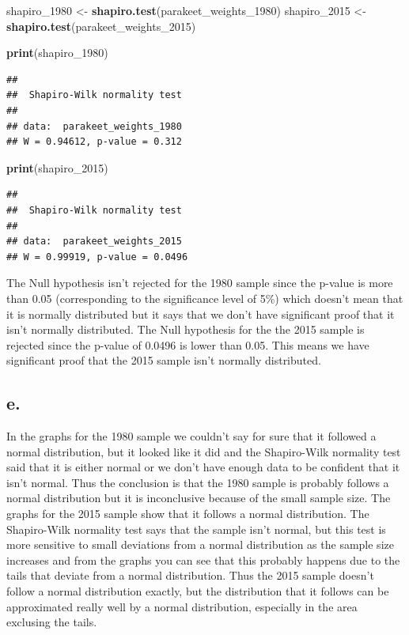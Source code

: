 \documentclass[
]{article}
\newenvironment{Shaded}{\begin{snugshade}}{\end{snugshade}}
\newcommand{\FunctionTok}[1]{\textcolor[rgb]{0.13,0.29,0.53}{\textbf{#1}}}
\newcommand{\NormalTok}[1]{#1}
\newcommand{\OtherTok}[1]{\textcolor[rgb]{0.56,0.35,0.01}{#1}}
\begin{document}
\begin{Shaded}
\begin{Highlighting}[]
\NormalTok{shapiro\_1980 }\OtherTok{\textless{}{-}} \FunctionTok{shapiro.test}\NormalTok{(parakeet\_weights\_1980)}
\NormalTok{shapiro\_2015 }\OtherTok{\textless{}{-}} \FunctionTok{shapiro.test}\NormalTok{(parakeet\_weights\_2015)}

\FunctionTok{print}\NormalTok{(shapiro\_1980)}
\end{Highlighting}
\end{Shaded}

\begin{verbatim}
## 
##  Shapiro-Wilk normality test
## 
## data:  parakeet_weights_1980
## W = 0.94612, p-value = 0.312
\end{verbatim}

\begin{Shaded}
\begin{Highlighting}[]
\FunctionTok{print}\NormalTok{(shapiro\_2015)}
\end{Highlighting}
\end{Shaded}

\begin{verbatim}
## 
##  Shapiro-Wilk normality test
## 
## data:  parakeet_weights_2015
## W = 0.99919, p-value = 0.0496
\end{verbatim}

The Null hypothesis isn't rejected for the 1980 sample since the p-value
is more than 0.05 (corresponding to the significance level of 5\%) which
doesn't mean that it is normally distributed but it says that we don't
have significant proof that it isn't normally distributed. The Null
hypothesis for the the 2015 sample is rejected since the p-value of
0.0496 is lower than 0.05. This means we have significant proof that the
2015 sample isn't normally distributed.

\subsection{e.}\label{e.}

In the graphs for the 1980 sample we couldn't say for sure that it
followed a normal distribution, but it looked like it did and the
Shapiro-Wilk normality test said that it is either normal or we don't
have enough data to be confident that it isn't normal. Thus the
conclusion is that the 1980 sample is probably follows a normal
distribution but it is inconclusive because of the small sample size.
The graphs for the 2015 sample show that it follows a normal
distribution. The Shapiro-Wilk normality test says that the sample isn't
normal, but this test is more sensitive to small deviations from a
normal distribution as the sample size increases and from the graphs you
can see that this probably happens due to the tails that deviate from a
normal distribution. Thus the 2015 sample doesn't follow a normal
distribution exactly, but the distribution that it follows can be
approximated really well by a normal distribution, especially in the
area exclusing the tails.
\end{document}

